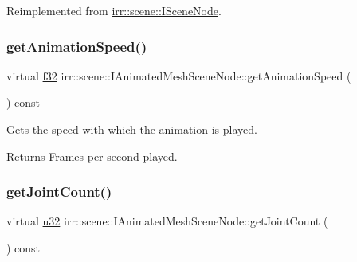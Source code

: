 Reimplemented from \hyperlink{classirr_1_1scene_1_1ISceneNode_ac39832b55855dc59196053adbaec95cc}{irr\+::scene\+::\+I\+Scene\+Node}.

\mbox{\label{classirr_1_1scene_1_1IAnimatedMeshSceneNode_a246c21ec2ae5b3a5cecc10f9cc3625c4}} 
\subsubsection{\texorpdfstring{get\+Animation\+Speed()}{getAnimationSpeed()}}
{\footnotesize\ttfamily virtual \hyperlink{namespaceirr_a0277be98d67dc26ff93b1a6a1d086b07}{f32} irr\+::scene\+::\+I\+Animated\+Mesh\+Scene\+Node\+::get\+Animation\+Speed (\begin{DoxyParamCaption}{ }\end{DoxyParamCaption}) const\hspace{0.3cm}{\ttfamily [pure virtual]}}



Gets the speed with which the animation is played. 

\begin{DoxyReturn}{Returns}
Frames per second played. 
\end{DoxyReturn}
\mbox{\label{classirr_1_1scene_1_1IAnimatedMeshSceneNode_a146657063c055fcb951ca6fd66171589}} 
\subsubsection{\texorpdfstring{get\+Joint\+Count()}{getJointCount()}}
{\footnotesize\ttfamily virtual \hyperlink{namespaceirr_a0416a53257075833e7002efd0a18e804}{u32} irr\+::scene\+::\+I\+Animated\+Mesh\+Scene\+Node\+::get\+Joint\+Count (\begin{DoxyParamCaption}{ }\end{DoxyParamCaption}) const\hspace{0.3cm}{\ttfamily [pure virtual]}}



